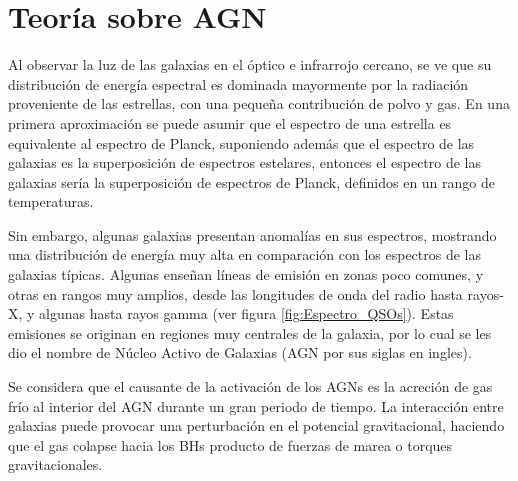 \begin{savequote}[50mm]
\end{savequote}




\chapter{Teoría sobre AGN}
\label{cha:Theoretical Framework}


Al observar la luz de las galaxias en el óptico e infrarrojo cercano, se ve que su distribución de energía espectral es dominada mayormente por la radiación proveniente de las estrellas, con una pequeña contribución de polvo y gas. En una primera aproximación se puede asumir que el espectro de una estrella es equivalente al espectro de Planck, suponiendo además que el espectro de las galaxias es la superposición de espectros estelares, entonces el espectro de las galaxias sería la superposición de espectros de Planck, definidos en un rango de temperaturas. 


Sin embargo, algunas galaxias presentan anomalías en sus espectros,  mostrando una distribución de energía muy alta en comparación con los espectros  de las galaxias típicas. Algunas enseñan líneas de emisión en zonas poco comunes, y otras en rangos muy amplios, desde las longitudes de onda del radio hasta rayos-X, y algunas hasta rayos gamma (ver figura \ref{fig:Espectro_QSOs}). Estas emisiones se originan en regiones muy centrales de la galaxia, por lo cual se les dio el nombre de Núcleo Activo de Galaxias (AGN por sus siglas en ingles).

Se considera que el causante de la activación de los AGNs es la acreción de gas frío al interior del AGN durante un gran periodo de tiempo. La interacción entre galaxias puede provocar una perturbación en el potencial gravitacional, haciendo que el gas colapse hacia los BHs producto de fuerzas de marea o torques gravitacionales.

